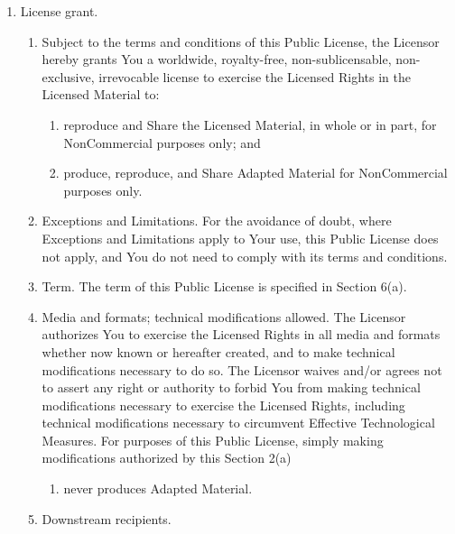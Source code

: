 \documentclass[
]{scrbook}
\providecommand{\tightlist}{%
  \setlength{\itemsep}{0pt}\setlength{\parskip}{0pt}}
\begin{document}
\begin{enumerate}
\def\labelenumi{\alph{enumi}.}
\item
  License grant.

  \begin{enumerate}
  \def\labelenumii{\arabic{enumii}.}
  \item
    Subject to the terms and conditions of this Public License, the
    Licensor hereby grants You a worldwide, royalty-free,
    non-sublicensable, non-exclusive, irrevocable license to exercise
    the Licensed Rights in the Licensed Material to:

    \begin{enumerate}
    \def\labelenumiii{\alph{enumiii}.}
    \item
      reproduce and Share the Licensed Material, in whole or in part,
      for NonCommercial purposes only; and
    \item
      produce, reproduce, and Share Adapted Material for NonCommercial
      purposes only.
    \end{enumerate}
  \item
    Exceptions and Limitations. For the avoidance of doubt, where
    Exceptions and Limitations apply to Your use, this Public License
    does not apply, and You do not need to comply with its terms and
    conditions.
  \item
    Term. The term of this Public License is specified in Section 6(a).
  \item
    Media and formats; technical modifications allowed. The Licensor
    authorizes You to exercise the Licensed Rights in all media and
    formats whether now known or hereafter created, and to make
    technical modifications necessary to do so. The Licensor waives
    and/or agrees not to assert any right or authority to forbid You
    from making technical modifications necessary to exercise the
    Licensed Rights, including technical modifications necessary to
    circumvent Effective Technological Measures. For purposes of this
    Public License, simply making modifications authorized by this
    Section 2(a)

    \begin{enumerate}
    \def\labelenumiii{(\arabic{enumiii})}
    \setcounter{enumiii}{3}
    \tightlist
    \item
      never produces Adapted Material.
    \end{enumerate}
  \item
    Downstream recipients.


\end{enumerate}
\end{enumerate}
\end{document}
